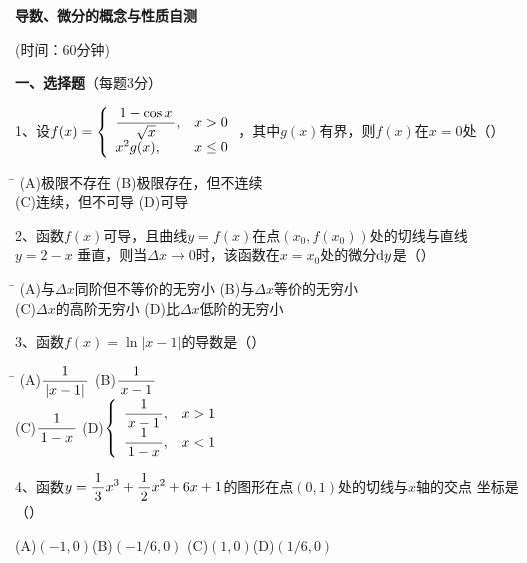 \begin{center}
	{\Large\bf 导数、微分的概念与性质自测}
	
	(时间：60分钟)
\end{center}

\bigskip

{\bf 一、选择题}（每题3分）

\bigskip

1、设$f(x)=\left\{\begin{array}{ll}
\displaystyle\frac{\,{1-\cos x}\,}{\,{\sqrt x}\,},& x>0\\ x^2g(x),& x\leq 0
\end{array}\right.$，其中$g(x)$有界，则$f(x)$在$x=0$处（\quad）%
\begin{tabbing}
	\hspace{8cm}\=\kill
	\quad\quad\quad(A)\;极限不存在 \> 
	(B)\;极限存在，但不连续 \\ 
	\quad\quad\quad(C)\;连续，但不可导\>
	(D)\;可导
\end{tabbing}

\bigskip

2、函数$f(x)$可导，且曲线$y=f(x)$在点$(x_0,f(x_0))$处的切线与直线$y=2-x$
垂直，则当$\Delta x\to0$时，该函数在$x=x_0$处的微分$\mathrm{d} y$是（\quad）%
\begin{tabbing}
	\hspace{8cm}\=\kill
	\quad\quad\quad(A)\;与$\Delta x$同阶但不等价的无穷小 \> 
	(B)\;与$\Delta x$等价的无穷小 \\ 
	\quad\quad\quad(C)\;$\Delta x$的高阶无穷小\>
	(D)\;比$\Delta x$低阶的无穷小
\end{tabbing}

\bigskip

3、函数$f(x)=\ln|x-1|$的导数是（\quad）%
\begin{tabbing}
	\hspace{8cm}\=\kill
	\quad\quad\quad(A)\;$\displaystyle\frac{\,{1}\,}{\,{|x-1|}\,}$ \> 
	(B)\;$\displaystyle\frac{\,{1}\,}{\,{x-1}\,}$ \\ 
	\quad\quad\quad(C)\;$\displaystyle\frac{\,{1}\,}{\,{1-x}\,}$\>
	(D)\;$\left\{\begin{array}{ll}
	\displaystyle\frac{\,{1}\,}{\,{x-1}\,},&x>1\\ \displaystyle\frac{\,{1}\,}{\,{1-x}\,},&x<1
	\end{array}\right.$
\end{tabbing}

\bigskip

4、函数$y=\displaystyle\frac{\,{1}\,}{\,{3}\,}x^3+\displaystyle\frac{\,{1}\,}{\,{2}\,}x^2+6x+1$的图形在点$(0,1)$处的切线与$x$轴的交点
坐标是（\quad）%

\quad (A)\;$(-1,0)$\quad\quad\quad(B)\;$(-1/6,0)$
\quad\quad\quad (C)\;$(1,0)$\quad\quad\quad(D)\;$(1/6,0)$

